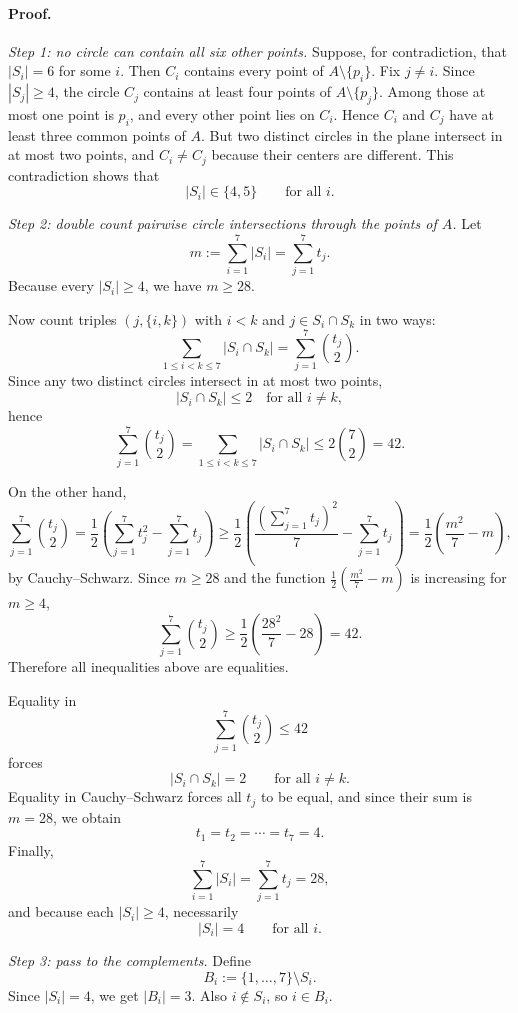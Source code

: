 \paragraph{Proof.}
\emph{Step 1: no circle can contain all six other points.}
Suppose, for contradiction, that $|S_i|=6$ for some $i$. Then $C_i$ contains every point of $A\setminus\{p_i\}$.
Fix $j\neq i$. Since $|S_j|\ge 4$, the circle $C_j$ contains at least four points of $A\setminus\{p_j\}$.
Among those at most one point is $p_i$, and every other point lies on $C_i$.
Hence $C_i$ and $C_j$ have at least three common points of $A$.
But two distinct circles in the plane intersect in at most two points, and $C_i\neq C_j$ because their centers are different.
This contradiction shows that
\[
|S_i|\in\{4,5\}\qquad\text{for all }i.
\]

\medskip

\emph{Step 2: double count pairwise circle intersections through the points of $A$.}
Let
\[
m:=\sum_{i=1}^7 |S_i|=\sum_{j=1}^7 t_j.
\]
Because every $|S_i|\ge 4$, we have $m\ge 28$.

Now count triples $(j,\{i,k\})$ with $i<k$ and $j\in S_i\cap S_k$ in two ways:
\[
\sum_{1\le i<k\le 7} |S_i\cap S_k|
=
\sum_{j=1}^7 \binom{t_j}{2}.
\]
Since any two distinct circles intersect in at most two points,
\[
|S_i\cap S_k|\le 2
\quad\text{for all }i\neq k,
\]
hence
\[
\sum_{j=1}^7 \binom{t_j}{2}
=
\sum_{1\le i<k\le 7} |S_i\cap S_k|
\le 2\binom{7}{2}=42.
\]

On the other hand,
\[
\sum_{j=1}^7 \binom{t_j}{2}
=
\frac12\left(\sum_{j=1}^7 t_j^2-\sum_{j=1}^7 t_j\right)
\ge
\frac12\left(\frac{(\sum_{j=1}^7 t_j)^2}{7}-\sum_{j=1}^7 t_j\right)
=
\frac12\left(\frac{m^2}{7}-m\right),
\]
by Cauchy--Schwarz.
Since $m\ge 28$ and the function $\frac12(\frac{m^2}{7}-m)$ is increasing for $m\ge 4$,
\[
\sum_{j=1}^7 \binom{t_j}{2}
\ge
\frac12\left(\frac{28^2}{7}-28\right)=42.
\]
Therefore all inequalities above are equalities.

Equality in
\[
\sum_{j=1}^7 \binom{t_j}{2}\le 42
\]
forces
\[
|S_i\cap S_k|=2\qquad\text{for all }i\neq k.
\]
Equality in Cauchy--Schwarz forces all $t_j$ to be equal, and since their sum is $m=28$, we obtain
\[
t_1=t_2=\cdots=t_7=4.
\]
Finally,
\[
\sum_{i=1}^7 |S_i|=\sum_{j=1}^7 t_j=28,
\]
and because each $|S_i|\ge 4$, necessarily
\[
|S_i|=4\qquad\text{for all }i.
\]

\medskip

\emph{Step 3: pass to the complements.}
Define
\[
B_i:=\{1,\dots,7\}\setminus S_i.
\]
Since $|S_i|=4$, we get $|B_i|=3$. Also $i\notin S_i$, so $i\in B_i$.

